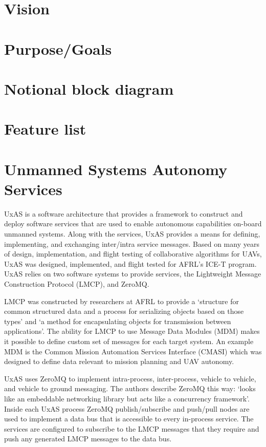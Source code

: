 \section{Vision}
\section{Purpose/Goals}
\section{Notional block diagram}
\section{Feature list}


\section{Unmanned Systems Autonomy Services}
UxAS is a software architecture that provides a framework to construct and deploy software services that are used to enable autonomous capabilities on-board unmanned systems. Along with the services, UxAS provides a means for defining, implementing, and exchanging inter/intra service messages.  Based on many years of design, implementation, and flight testing of collaborative algorithms for UAVs, UxAS was designed, implemented, and flight tested for AFRL's ICE-T program. UxAS relies on two software systems to provide services, the Lightweight Message Construction Protocol (LMCP), and ZeroMQ. 

LMCP was constructed by researchers at AFRL to provide a `structure for common structured data and a process for serializing objects based on those types' and `a method for encapsulating objects for transmission between applications'\cite{Duquette:2010}. The ability for LMCP to use Message Data Modules (MDM) makes it possible to define custom set of messages for each target system. An example MDM is the Common Mission Automation Services Interface (CMASI) which was designed to define data relevant to mission planning and UAV autonomy.

UxAS uses ZeroMQ to implement intra-process, inter-process, vehicle to vehicle, and vehicle to ground messaging. The authors describe ZeroMQ this way:  `looks like an embeddable networking library but acts like a concurrency framework'\cite{ZeroMQBook:2013}. Inside each UxAS process ZeroMQ publish/subscribe and push/pull nodes are used to implement a data bus that is accessible to every in-process service. The services are configured to subscribe to the LMCP messages that they require and push any generated LMCP messages to the data bus. 

